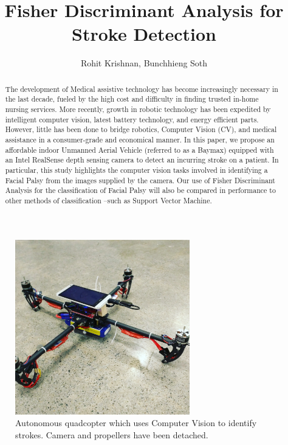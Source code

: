 \documentclass[12pt, conference]{IEEEtran}
\begin{document}
\title{Fisher Discriminant Analysis for Stroke Detection}

\author{Rohit Krishnan, Bunchhieng Soth}

\maketitle

\begin{abstract}
The development of Medical assistive technology has become increasingly necessary in the last decade, fueled by the high cost and difficulty in finding trusted in-home nursing services. More recently, growth in robotic technology has been expedited by intelligent computer vision, latest battery technology, and energy efficient parts. However, little has been done to bridge robotics, Computer Vision (CV), and medical assistance in a consumer-grade and economical manner. In this paper, we propose an affordable indoor Unmanned Aerial Vehicle (referred to as a Baymax) equipped with an Intel RealSense depth sensing camera to detect an incurring stroke on a patient. In particular, this study highlights the computer vision tasks involved in identifying a Facial Palsy from the images supplied by the camera. Our use of Fisher Discriminant Analysis for the classification of Facial Palsy will also be compared in performance to other methods of classification –such as Support Vector Machine.
\end{abstract}

\IEEEpeerreviewmaketitle

\begin{figure}
\begin{center}
\includegraphics[width=7.6cm]{pictures/dronepic}
\end{center}
\caption{Autonomous quadcopter which uses Computer Vision to identify strokes. Camera and propellers have been detached.}
\label{dronepic}
\end{figure}
\end{document}
